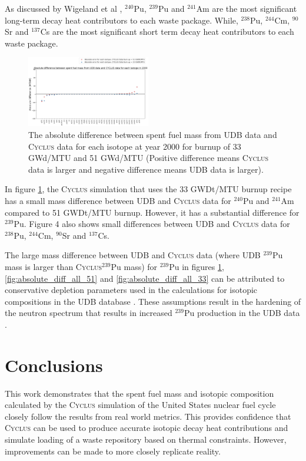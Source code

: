 \documentclass{anstrans}
\newcommand{\Cyclus}{\textsc{Cyclus}\xspace}%
\begin{document}
As discussed by Wigeland et al \cite{wigeland_separations_2006}, $^{240}$Pu, 
$^{239}$Pu and $^{241}$Am are the most significant long-term decay heat 
contributors to each waste package. While, $^{238}$Pu, $^{244}$Cm, $^{90}$Sr 
and $^{137}$Cs are the most significant short term decay heat contributors 
\cite{wigeland_separations_2006} to each waste package. 

\begin{figure}[t] %
	\centering
	\includegraphics[width=0.48\textwidth]{figures/absolute_diff_2000}
	\caption{The absolute difference between spent fuel mass from UDB data and \Cyclus data for each isotope at year 2000 for burnup of 33 GWd/MTU and 51 GWd/MTU (Positive difference means \Cyclus data is larger and negative difference means UDB data is larger).}
	\label{fig:absolute_diff_2000}
\end{figure} 

In figure \ref{fig:absolute_diff_2000}, the \Cyclus simulation that uses the 33 
GWDt/MTU burnup recipe has a small mass difference between UDB and \Cyclus data 
for $^{240}$Pu and $^{241}$Am compared to 51 GWDt/MTU burnup. However, it has a 
substantial difference for $^{239}$Pu. Figure 4 also shows small differences 
between UDB and \Cyclus data for $^{238}$Pu, $^{244}$Cm, $^{90}$Sr and 
$^{137}$Cs. 

The large mass difference between UDB and \Cyclus data (where UDB $^{239}$Pu 
mass is larger than \Cyclus $^{239}$Pu mass) for $^{239}$Pu in figures 
\ref{fig:absolute_diff_2000}, \ref{fig:absolute_diff_all_51} and 
\ref{fig:absolute_diff_all_33} can be attributed to conservative depletion 
parameters used in the calculations for isotopic compositions in the UDB 
database \cite{peterson_additional_2017}. These assumptions result in the 
hardening of the neutron spectrum that results in increased $^{239}$Pu 
production in the UDB data \cite{peterson_additional_2017}. 

\section{Conclusions}
This work demonstrates that the spent fuel mass and isotopic composition 
calculated by the \Cyclus simulation of the United States nuclear fuel cycle 
closely follow the results from real world metrics. This provides confidence 
that \Cyclus can be used to produce accurate isotopic decay heat contributions and 
simulate loading of a waste repository based on thermal constraints. However, 
improvements can be made to more closely replicate reality.  
\end{document}
